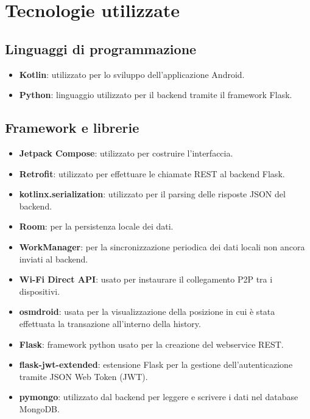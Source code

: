 \section{Tecnologie utilizzate}
\label{sec:tecnologie}


\subsection{Linguaggi di programmazione}

\begin{itemize}[label={--}, leftmargin=1.2cm]
    \item \textbf{Kotlin}: utilizzato per lo sviluppo dell'applicazione Android.

    \item \textbf{Python}: linguaggio utilizzato per il backend tramite il framework Flask.
\end{itemize}

\subsection{Framework e librerie}

\begin{itemize}[label={--}, leftmargin=1.2cm]
    \item \textbf{Jetpack Compose}: utilizzato per costruire l'interfaccia.

    \item \textbf{Retrofit}: utilizzato per effettuare le chiamate REST al backend Flask.

    \item \textbf{kotlinx.serialization}: utilizzato per il parsing delle risposte JSON del backend.

    \item \textbf{Room}: per la persistenza locale dei dati.

    \item \textbf{WorkManager}: per la sincronizzazione periodica dei dati locali non ancora inviati al backend.

    \item \textbf{Wi-Fi Direct API}: usato per instaurare il collegamento P2P tra i dispositivi.

    \item \textbf{osmdroid}: usata per la visualizzazione della posizione in cui è stata effettuata la transazione all'interno della history.

    \item \textbf{Flask}: framework python usato per la creazione del webservice REST.

    \item \textbf{flask-jwt-extended}: estensione Flask per la gestione dell'autenticazione tramite JSON Web Token (JWT).

    \item \textbf{pymongo}: utilizzato dal backend per leggere e scrivere i dati nel database MongoDB.
\end{itemize}

